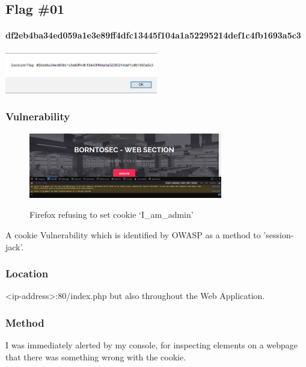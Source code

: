 \subsection{Flag \#01}
\paragraph{df2eb4ba34ed059a1e3e89ff4dfc13445f104a1a52295214def1c4fb1693a5c3}
\begin{center}
    \includegraphics[width=0.5\textwidth]{3.cookies/01-03.png}\\[0cm] 
\end{center}

\subsubsection{Vulnerability}
\begin{figure}[!htb]
    \centering
    \includegraphics[width=0.752\textwidth]{3.cookies/01-01.png}\\[0cm]  
    \caption[Cookie Alert]{Firefox refusing to set cookie `I\_am\_admin'}
    \label{fig:03-01 - Firefox rejects cookie iamadmin} 
\end{figure}
A cookie Vulnerability which is identified by OWASP as a
method to 'session-jack'\cite{OWASP}.

\subsubsection{Location}
<ip-address>:80/index.php but also throughout the Web Application.

\subsubsection{Method}

I was immediately alerted by my console, for inspecting elements on
a webpage that there was something wrong with the cookie.

